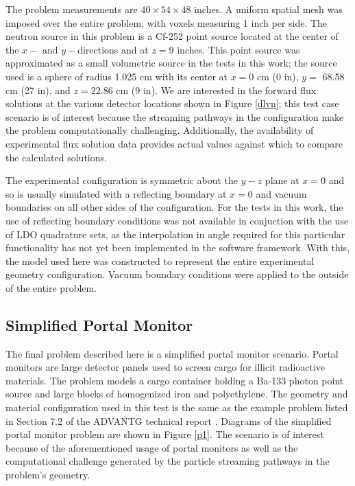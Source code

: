 \documentclass{article} %
\begin{document}
The problem measurements are $40\times54\times48$ inches. A uniform spatial
mesh was imposed over the entire problem, with voxels measuring 1 inch per side.
The neutron source in this problem is a Cf-252 point source located at the 
center of the $x-$ and $y-$directions and at $z = 9$ inches.
This point source was approximated as a small volumetric source in the tests in
this work; the source used is a sphere of radius 1.025 cm with its center at
$x = 0$ cm (0 in), $y =$ 68.58 cm (27 in), and $z = 22.86$ cm (9 in). 
We are interested in the forward flux solutions at the various detector
locations shown in Figure \ref{dlvn}; this test case scenario is of interest 
because the streaming pathways in the configuration make the problem computationally
challenging. Additionally, the availability of experimental flux solution data
provides actual values against which to compare the calculated solutions.

The experimental configuration is symmetric about the $y-z$ plane at $x = 0$
and so is usually simulated with a reflecting boundary at $x = 0$ and vacuum
boundaries on all other sides of the configuration. For the tests in this
work, the use of reflecting boundary conditions was not available in
conjuction with the use of LDO quadrature sets, as the interpolation in angle
required for this particular functionality has not yet been implemented in the
software framework.  With this, the model used here was constructed to
represent the entire experimental geometry configuration. Vacuum boundary
conditions were applied to the outside of the entire problem.

\subsection{Simplified Portal Monitor}

The final problem described here is a simplified portal monitor scenario.
Portal monitors are large detector panels used to screen cargo for illicit
radioactive materials. The problem models a cargo container holding a Ba-133
photon point source and large blocks of homogenized iron and polyethylene.
The geometry and material configuration used in this test is the same as the
example problem listed in Section 7.2 of the ADVANTG technical report
\cite{advantg}. Diagrams of the simplified portal monitor problem are shown in
Figure \ref{p1}. The scenario is of interest because of the aforementioned
usage of portal monitors as well as the computational challenge generated by
the particle streaming pathways in the problem's geometry.
\end{document}
